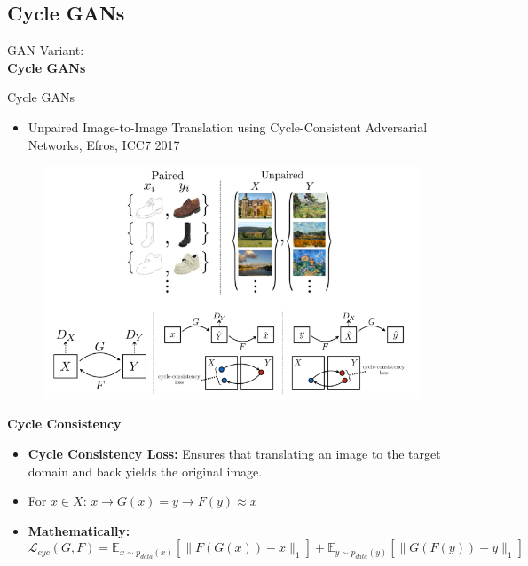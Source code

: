 \subsection{Cycle GANs}
\begin{frame}{}
    \LARGE GAN Variant: \\[1.5ex] \textbf{Cycle GANs}
\end{frame}


\begin{frame}[allowframebreaks]{Cycle GANs}

\begin{itemize}
    \item Unpaired Image-to-Image Translation using Cycle-Consistent Adversarial Networks, Efros, ICC7 2017
    
\end{itemize}
\begin{figure}
    \centering
    \includegraphics[height=0.7\textheight, width=\textwidth, keepaspectratio]{images/gan/cycle_gan_1.png}
\end{figure}
\framebreak
\textbf{Cycle Consistency}

\begin{itemize}
    \item \textbf{Cycle Consistency Loss:} Ensures that translating an image to the target domain and back yields the original image.
    \item For $x \in X$: $x \rightarrow G(x) = y \rightarrow F(y) \approx x$
    \item \textbf{Mathematically:}
    \[
        \mathcal{L}_{cyc}(G, F) = \mathbb{E}_{x \sim p_{data}(x)} \left[ \| F(G(x)) - x \|_1 \right] + \mathbb{E}_{y \sim p_{data}(y)} \left[ \| G(F(y)) - y \|_1 \right]
    \]
\end{itemize}


\end{frame}
